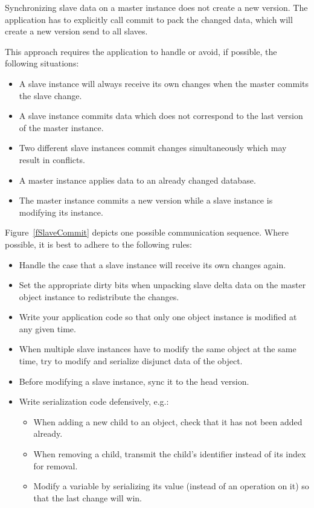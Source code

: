 \documentclass[10pt,a4]{scrartcl}
\newcommand{\fig}[1]{Figure~\ref{#1}}
\begin{document}
Synchronizing slave data on a master instance does not create a new version. The
application has to explicitly call \textsf{commit} to pack the changed data,
which will create a new version send to all slaves.

This approach requires the application to handle or avoid, if possible, the
following situations:
\begin{itemize}
\item A slave instance will always receive its own changes when the master
  commits the slave change.
\item A slave instance commits data which does not correspond to the last
  version of the master instance.
\item Two different slave instances commit changes simultaneously which may
  result in conflicts.
\item A master instance applies data to an already changed database.
\item The master instance commits a new version while a slave instance is
  modifying its instance. 
\end{itemize}

\fig{fSlaveCommit} depicts one possible communication sequence. Where possible,
it is best to adhere to the following rules:
\begin{itemize}
\item Handle the case that a slave instance will receive its own changes again.
\item Set the appropriate dirty bits when unpacking slave delta data on the
  master object instance to redistribute the changes.
\item Write your application code so that only one object instance is modified
  at any given time. 
\item When multiple slave instances have to modify the same object at the same
  time, try to modify and serialize disjunct data of the object.
\item Before modifying a slave instance, \textsf{sync} it to the head version.
\item Write serialization code defensively, e.g.:
  \begin{itemize}
  \item When adding a new child to an object, check that it has not been added
    already.
    \item When removing a child, transmit the child's identifier instead of its
      index for removal.
    \item Modify a variable by serializing its value (instead of an operation on
      it) so that the last change will win.
  \end{itemize}
\end{itemize}
\end{document}
